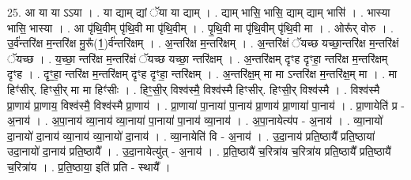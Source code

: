 \documentclass[17pt]{extarticle}
\begin{document}
25. आ या या ऽऽया । . या द्याम् द्यां ॅया या द्याम् । . द्याम् भासि॒ भासि॒ द्याम् द्याम् भासि॑ । . भास्या भासि॒ भास्या । . आ पृ॑थि॒वीम् पृ॑थि॒वी मा पृ॑थि॒वीम् । . पृ॒थि॒वी मा पृ॑थि॒वीम् पृ॑थि॒वी मा । . ओरू᳚र् वोरु । . उ॒र्व॑न्तरि॑क्ष म॒न्तरि॑क्ष मु॒रू᳚(1॒)र्व॑न्तरि॑क्षम् । . अ॒न्तरि॑क्ष म॒न्तरि॑क्षम् । . अ॒न्तरि॑क्षं ॅयच्छ यच्छा॒न्तरि॑क्ष म॒न्तरि॑क्षं ॅयच्छ । . य॒च्छा॒ न्तरि॑क्ष म॒न्तरि॑क्षं ॅयच्छ यच्छा॒ न्तरि॑क्षम् । . अ॒न्तरि॑क्षम् दृꣳह दृꣳहा॒ न्तरि॑क्ष म॒न्तरि॑क्षम् दृꣳह । . दृꣳ॒॒हा॒ न्तरि॑क्ष म॒न्तरि॑क्षम् दृꣳह दृꣳहा॒ न्तरि॑क्षम् । . अ॒न्तरि॑क्ष॒म् मा मा ऽन्तरि॑क्ष म॒न्तरि॑क्ष॒म् मा । . मा हिꣳ॑सीर्. हिꣳसी॒र् मा मा हिꣳ॑सीः । . हिꣳ॒॒सी॒र् विश्व॑स्मै॒ विश्व॑स्मै हिꣳसीर्. हिꣳसी॒र् विश्व॑स्मै । . विश्व॑स्मै प्रा॒णाय॑ प्रा॒णाय॒ विश्व॑स्मै॒ विश्व॑स्मै प्रा॒णाय॑ । . प्रा॒णाया॑ पा॒नाया॑ पा॒नाय॑ प्रा॒णाय॑ प्रा॒णाया॑ पा॒नाय॑ । . प्रा॒णायेति॑ प्र - अ॒नाय॑ । . अ॒पा॒नाय॑ व्या॒नाय॑ व्या॒नाया॑ पा॒नाया॑ पा॒नाय॑ व्या॒नाय॑ । . अ॒पा॒नायेत्य॑प - अ॒नाय॑ । . व्या॒नायो॑ दा॒नायो॑ दा॒नाय॑ व्या॒नाय॑ व्या॒नायो॑ दा॒नाय॑ । . व्या॒नायेति॑ वि - अ॒नाय॑ । . उ॒दा॒नाय॑ प्रति॒ष्ठायै᳚ प्रति॒ष्ठाया॑ उदा॒नायो॑ दा॒नाय॑ प्रति॒ष्ठायै᳚ । . उ॒दा॒नायेत्यु॑त् - अ॒नाय॑ । . प्र॒ति॒ष्ठायै॑ च॒रित्रा॑य च॒रित्रा॑य प्रति॒ष्ठायै᳚ प्रति॒ष्ठायै॑ च॒रित्रा॑य । . प्र॒ति॒ष्ठाया॒ इति॑ प्रति - स्थायै᳚ । \newline
\end{document}
